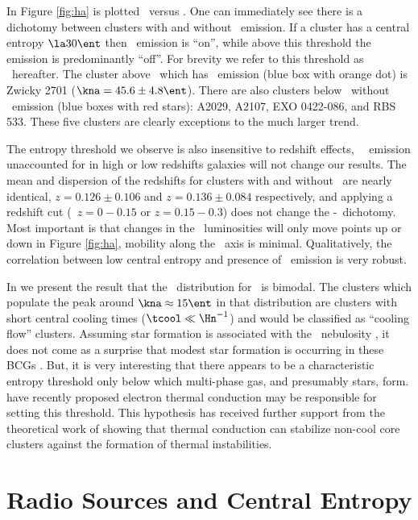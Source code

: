 \documentclass{emulateapj}
\begin{document}
In Figure \ref{fig:ha} is plotted \kna\ versus \lha. One can
immediately see there is a dichotomy between clusters with and without
\halpha\ emission. If a cluster has a central entropy $\la 30 \ent$
then \halpha\ emission is ``on'', while above this threshold the
emission is predominantly ``off''. For brevity we refer to this
threshold as \kthr\ hereafter. The cluster above \kthr\ which has
\halpha\ emission (blue box with orange dot) is Zwicky 2701 ($\kna =
45.6 \pm 4.8 \ent$). There are also clusters below \kthr\ without
\halpha\ emission (blue boxes with red stars): A2029, A2107, EXO
0422-086, and RBS 533. These five clusters are clearly exceptions to
the much larger trend.

The entropy threshold we observe is also insensitive to redshift
effects, \ie\ \halpha\ emission unaccounted for in high or low
redshifts galaxies will not change our results. The mean and
dispersion of the redshifts for clusters with and without \halpha\ are
nearly identical, $z = 0.126 \pm 0.106$ and $z = 0.136 \pm 0.084$
respectively, and applying a redshift cut (\ie\ $z = 0-0.15$ or $z =
0.15-0.3$) does not change the \kna-\halpha\ dichotomy. Most important
is that changes in the \halpha\ luminosities will only move points up
or down in Figure \ref{fig:ha}, mobility along the \kna\ axis is
minimal. Qualitatively, the correlation between low central entropy
and presence of \halpha\ emission is very robust.

In \cite{accept} we present the result that the \kna\ distribution for
\accept\ is bimodal. The clusters which populate the peak around $\kna
\approx 15 \ent$ in that distribution are clusters with short central
cooling times ($\tcool \ll \Hn^{-1}$) and would be classified as
``cooling flow'' clusters. Assuming star formation is associated with
the \halpha\ nebulosity \citep{voit97,cardiel98}, it does not come as
a surprise that modest star formation is occurring in these BCGs
\citep{johnstone87, mcnamara89}. But, it is very interesting that
there appears to be a characteristic entropy threshold only below
which multi-phase gas, and presumably stars, form. \cite{conduction}
have recently proposed electron thermal conduction may be responsible
for setting this threshold. This hypothesis has received further
support from the theoretical work of \cite{2008arXiv0804.3823G}
showing that thermal conduction can stabilize non-cool core clusters
against the formation of thermal instabilities.

\section{Radio Sources and Central Entropy}
\label{sec:agn}
\end{document}
